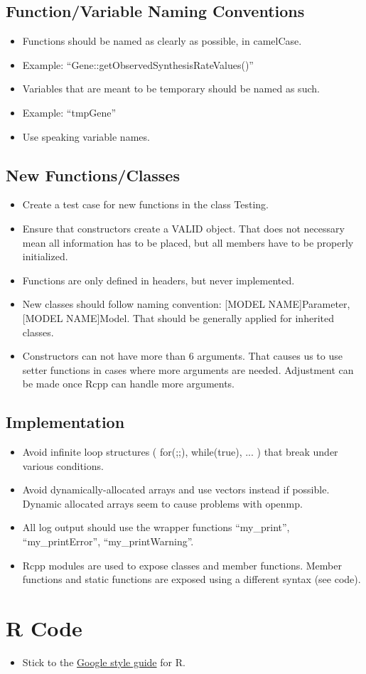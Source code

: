 \documentclass[letter,10pt]{article}
\newcommand{\sep}{\discretionary{}{}{}} %
\begin{document}
\subsection{Function/Variable Naming Conventions}
\begin{itemize}
    \item Functions should be named as clearly as possible, in camelCase.
    \item Example: \enquote{Gene::getObservedSynthesisRateValues()}
    \item Variables that are meant to be temporary should be named as such.
    \item Example: \enquote{tmpGene}
    \item Use speaking variable names.
\end{itemize}

\subsection{New Functions/Classes}
\begin{itemize}
    \item Create a test case for new functions in the class Testing.
    \item Ensure that constructors create a VALID object. 
    That does not necessary mean all information has to be placed, but all members have to be properly initialized. 
    \item Functions are only defined in headers, but never implemented.
    \item New classes should follow naming convention: [MODEL NAME]\sep Parameter, [MODEL NAME]\sep Model.
    That should be generally applied for inherited classes.
    \item Constructors can not have more than 6 arguments. 
    That causes us to use setter functions in cases where more arguments are needed. 
    Adjustment can be made once Rcpp can handle more arguments.
\end{itemize}

\subsection{Implementation}
\begin{itemize}
    \item Avoid infinite loop structures ( for(;;), while(true), ... ) that break under various conditions.
    \item Avoid dynamically-allocated arrays and use vectors instead if possible.
    Dynamic allocated arrays seem to cause problems with openmp.
    \item All log output should use the wrapper functions \enquote{my\sep \_print}, \enquote{my\sep \_printError}, \enquote{my\sep \_printWarning}.
    \item Rcpp modules are used to expose classes and member functions. Member functions and static functions are exposed using a different syntax (see code). 
\end{itemize}

\section{R Code}
\begin{itemize}
    \item Stick to the \href{http://google.github.io/styleguide/Rguide.xml}{Google style guide} for R.
\end{itemize}
\end{document}
